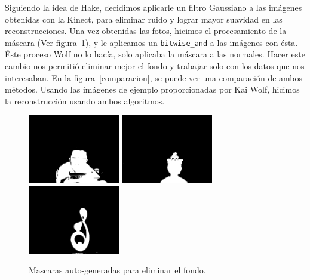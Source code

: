 \documentclass[twocolumn,11pts]{IEEEtran}
\begin{document}
Siguiendo la idea de Hake, decidimos aplicarle un filtro Gaussiano a las imágenes obtenidas con la Kinect, para eliminar ruido y lograr mayor suavidad en las reconstrucciones. Una vez obtenidas las fotos, hicimos el procesamiento de la máscara (Ver figura~\ref{mascaras}), y le aplicamos un \texttt{bitwise\_and} a las imágenes con ésta. Éste proceso Wolf no lo hacía, solo aplicaba la máscara a las normales. Hacer este cambio nos permitió eliminar mejor el fondo y trabajar solo con los datos que nos interesaban. En la figura~\ref{comparacion}, se puede ver una comparación de ambos métodos. Usando las imágenes de ejemplo proporcionadas por Kai Wolf, hicimos la reconstrucción usando ambos algoritmos. 

\begin{figure}[t]
\begin{center}
	\includegraphics[width= 4cm]{Mascaracrepu}
	\includegraphics[width= 4cm]{Mascaramona}
	\includegraphics[width= 4cm]{Mascaraniple}
		\caption{Mascaras auto-generadas para eliminar el fondo.}
		\label{mascaras}
\end{center}
\end{figure}
\end{document}
